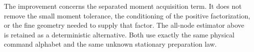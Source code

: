 The improvement concerns the separated moment acquisition term. It
does not remove the small moment tolerance, the conditioning of the
positive factorization, or the fine geometry needed to supply that
factor. The all-node estimator above is retained as a deterministic
alternative. Both use exactly the same physical command alphabet
and the same unknown stationary preparation law.
